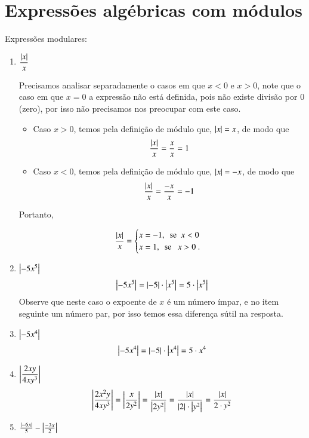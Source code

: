  
 
 \section{Expressões algébricas com módulos}%
 
 \begin{exem} Expressões modulares:
 \begin{enumerate}
  \item $\dfrac{\left|x\right|}{x}$

  Precisamos analisar separadamente o casos em que $x<0$ e $x>0$, note que o caso em que $x=0$ a expressão não está definida, pois não existe divisão por $0$ (zero), por isso não precisamos nos preocupar com este caso.

  \begin{itemize}
   \item Caso $x> 0$, temos pela definição de módulo que, $\left|x\right|= x$, de modo que
   \[\frac{\left|x\right|}{x}=\frac{x}{x}= 1\]
   \item Caso $x< 0$, temos pela definição de módulo que, $\left|x\right|= -x$, de modo que
   \[\frac{\left|x\right|}{x}=\frac{-x}{x}= -1\]
  \end{itemize}

 Portanto,

  \[ \frac{\left|x\right|}{x} = \begin{cases}
      x= -1, \ \ \text{se} \ \ x< 0 \\
      x= 1, \ \ \text{se } \ \ x> 0 \ .
     \end{cases}
  \]


 \item $\left|-5x^5\right|$
 \[\left|-5x^5\right|= \left|-5\right|\cdot \left|x^5\right|= 5 \cdot \left|x^5\right|\]
 Observe que neste caso o expoente de $x$ é um número ímpar, e no item seguinte um número par, por isso temos essa diferença sútil na resposta.

 \item $\left|-5x^4\right|$
 \[\left|-5x^4\right|= \left|-5\right|\cdot \left|x^4\right|= 5 \cdot x^4\]

 \item $\left|\dfrac{2xy}{4xy^3}\right|$
 \[\left|\frac{2x^2y}{4xy^3}\right| = \left|\frac{x}{2y^2}\right|= \frac{\left|x\right|}{\left|2y^2\right|}= \frac{\left|x\right|}{\left|2\right| \cdot \left|y^2\right|}= \frac{\left|x\right|}{2 \cdot y^2}\]

 \item $\frac{\left|-6x\right|}{5} - \left|\frac{-3x}{2}\right|$


\end{enumerate}
\end{exem}
